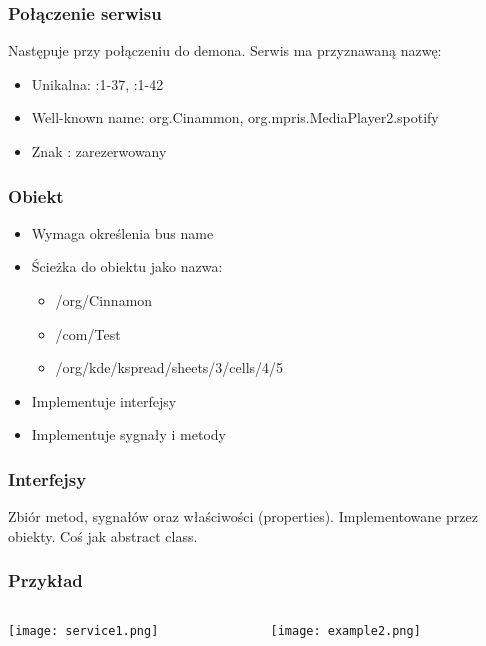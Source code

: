 \begin{frame}
    \frametitle{Połączenie serwisu}
    Następuje przy połączeniu do demona.
    Serwis ma przyznawaną nazwę:
    \begin{itemize}
        \item Unikalna: :1-37, :1-42
        \item Well-known name: org.Cinammon, org.mpris.MediaPlayer2.spotify
        \item Znak : zarezerwowany
    \end{itemize}
\end{frame}

\begin{frame}
    \frametitle{Obiekt}
    \begin{itemize}
        \item Wymaga określenia bus name
        \item Ścieżka do obiektu jako nazwa: 
        \begin{itemize}
            \item /org/Cinnamon 
            \item /com/Test
            \item /org/kde/kspread/sheets/3/cells/4/5
        \end{itemize}
        \item Implementuje interfejsy
        \item Implementuje sygnały i metody
    \end{itemize}
\end{frame}


\begin{frame}
    \frametitle{Interfejsy}
    Zbiór metod, sygnałów oraz właściwości (properties).
    Implementowane przez obiekty. 
    Coś jak abstract class.
\end{frame}

\begin{frame}
    \frametitle{Przykład}
    \begin{columns}
    \begin{column}{0.5\textwidth}
        \begin{center}
            \texttt{[image: service1.png]}
        \end{center}
    \end{column}
    \begin{column}{0.5\textwidth}
        \begin{center}
            \texttt{[image: example2.png]}        
        \end{center}
    \end{column}
\end{columns}
\end{frame}


